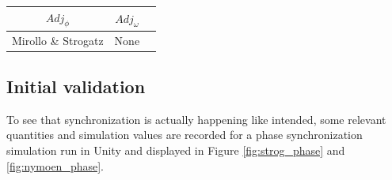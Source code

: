 \begin{center}
\begin{tabular}{ |c|c|c| } 
\hline
$Adj_\phi$ & $Adj_\omega$ \\
\hline
Mirollo \& Strogatz & None  \\
\hline
\end{tabular}
\label{tab:phase_sync}
\end{center}

	\subsection{Initial validation}
	
	To see that synchronization is actually happening like intended, some relevant quantities and simulation values are recorded for a phase synchronization simulation run in Unity and displayed in Figure \ref{fig:strog_phase} and \ref{fig:nymoen_phase}.
	
	
